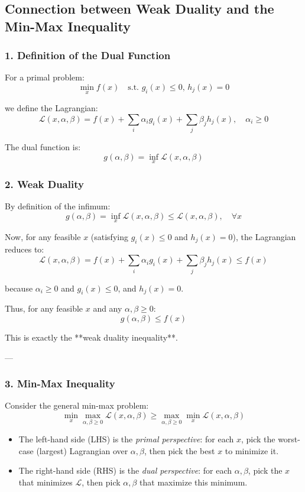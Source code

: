 \subsection{Connection between Weak Duality and the Min-Max Inequality}

\subsubsection*{1. Definition of the Dual Function}

For a primal problem:
\[
\min_x f(x) \quad \text{s.t. } g_i(x) \le 0, \, h_j(x) = 0
\]

we define the Lagrangian:
\[
\mathcal{L}(x,\alpha,\beta) = f(x) + \sum_{i} \alpha_i g_i(x) + \sum_j \beta_j h_j(x), \quad \alpha_i \ge 0
\]

The dual function is:
\[
g(\alpha,\beta) = \inf_x \mathcal{L}(x,\alpha,\beta)
\]

\subsubsection*{2. Weak Duality}

By definition of the infimum:
\[
g(\alpha,\beta) = \inf_x \mathcal{L}(x,\alpha,\beta) \le \mathcal{L}(x,\alpha,\beta), \quad \forall x
\]

Now, for any feasible \(x\) (satisfying \(g_i(x)\le 0\) and \(h_j(x)=0\)), the Lagrangian reduces to:
\[
\mathcal{L}(x,\alpha,\beta) = f(x) + \sum_i \alpha_i g_i(x) + \sum_j \beta_j h_j(x) \le f(x)
\]

because \(\alpha_i \ge 0\) and \(g_i(x) \le 0\), and \(h_j(x)=0\).  

Thus, for any feasible \(x\) and any \(\alpha,\beta\ge0\):
\[
g(\alpha,\beta) \le f(x)
\]

This is exactly the **weak duality inequality**.

---

\subsubsection*{3. Min-Max Inequality}

Consider the general min-max problem:
\[
\min_x \max_{\alpha,\beta \ge 0} \mathcal{L}(x,\alpha,\beta) \ge \max_{\alpha,\beta \ge 0} \min_x \mathcal{L}(x,\alpha,\beta)
\]

\begin{itemize}
    \item The left-hand side (LHS) is the \emph{primal perspective}: for each \(x\), pick the worst-case (largest) Lagrangian over \(\alpha,\beta\), then pick the best \(x\) to minimize it.
    \item The right-hand side (RHS) is the \emph{dual perspective}: for each \(\alpha,\beta\), pick the \(x\) that minimizes \(\mathcal{L}\), then pick \(\alpha,\beta\) that maximize this minimum.
\end{itemize}

